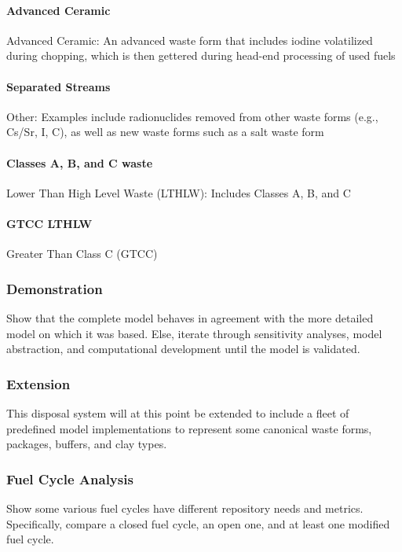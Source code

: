 \paragraph{Advanced Ceramic} Advanced Ceramic: An advanced waste form that 
includes iodine volatilized during chopping, which is then gettered during 
head-end processing of used fuels


\paragraph{Separated Streams} Other:  Examples include radionuclides removed 
from other waste forms (e.g., Cs/Sr, I, C), as well as new waste forms such as a 
salt waste form

\paragraph{Classes A, B, and C waste} Lower Than High Level Waste (LTHLW): 
Includes Classes A, B, and C

\paragraph{GTCC LTHLW}  Greater Than Class C (GTCC)


\subsubsection{Demonstration}

Show that the complete model behaves in agreement with the more detailed model 
on which it was based. Else, iterate through sensitivity analyses, model 
abstraction, and computational development until the model is validated. 



\subsubsection{Extension}

This disposal system will at this point be extended to include a fleet of 
predefined model implementations to represent some canonical waste forms, 
packages, buffers, and clay types.  

\subsubsection{Fuel Cycle Analysis}

Show some various fuel cycles have different repository needs and metrics.  
Specifically, compare a closed fuel cycle, an open one, and at least one 
modified fuel cycle. 





